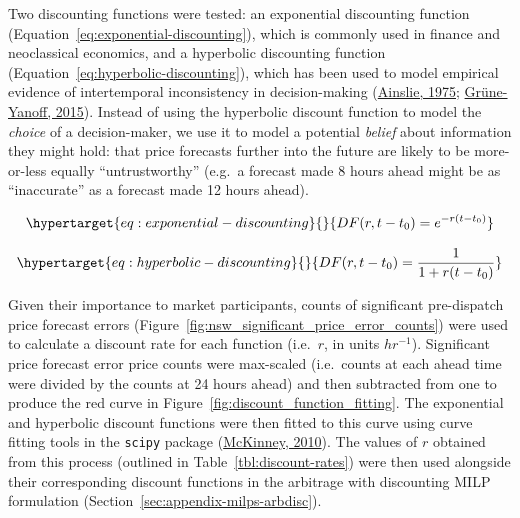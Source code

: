 \documentclass[12pt,a4paper,]{report}
\begin{document}
Two discounting functions were tested: an exponential discounting
function (Equation~\ref{eq:exponential-discounting}), which is commonly
used in finance and neoclassical economics, and a hyperbolic discounting
function (Equation~\ref{eq:hyperbolic-discounting}), which has been used
to model empirical evidence of intertemporal inconsistency in
decision-making
(\protect\hyperlink{ref-ainslieSpeciousRewardBehavioral1975}{Ainslie,
1975};
\protect\hyperlink{ref-grune-yanoffModelsTemporalDiscounting2015}{Grüne-Yanoff,
2015}). Instead of using the hyperbolic discount function to model the
\emph{choice} of a decision-maker, we use it to model a potential
\emph{belief} about information they might hold: that price forecasts
further into the future are likely to be more-or-less equally
``untrustworthy'' (e.g.~a forecast made 8 hours ahead might be as
``inaccurate'' as a forecast made 12 hours ahead).

\begin{equation}\protect\hypertarget{eq:exponential-discounting}{}{DF(r, t-t_0) = e^{-r(t-t_0)}}\label{eq:exponential-discounting}\end{equation}

\begin{equation}\protect\hypertarget{eq:hyperbolic-discounting}{}{DF(r, t-t_0) = \frac{1}{1+r(t-t_0)}}\label{eq:hyperbolic-discounting}\end{equation}

Given their importance to market participants, counts of significant
pre-dispatch price forecast errors
(Figure~\ref{fig:nsw_significant_price_error_counts}) were used to
calculate a discount rate for each function (i.e.~\(r\), in units
\(hr^{-1}\)). Significant price forecast error price counts were
max-scaled (i.e.~counts at each ahead time were divided by the counts at
24 hours ahead) and then subtracted from one to produce the red curve in
Figure~\ref{fig:discount_function_fitting}. The exponential and
hyperbolic discount functions were then fitted to this curve using curve
fitting tools in the \texttt{scipy} package
(\protect\hyperlink{ref-mckinney-proc-scipy-2010}{McKinney, 2010}). The
values of \(r\) obtained from this process (outlined in
Table~\ref{tbl:discount-rates}) were then used alongside their
corresponding discount functions in the arbitrage with discounting MILP
formulation (Section~\ref{sec:appendix-milps-arbdisc}).

\def\pandoctableshortcapt{Discount rates and RMSD from each discount
function fit}
\end{document}
